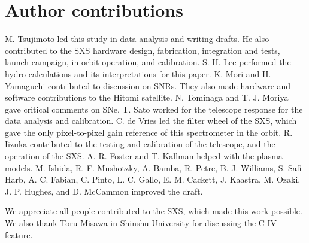 \documentclass[]{pasj01}
\newenvironment{trueauthors}{\section*{Author contributions}\fontsize{8}{11}\selectfont}{\par}
\begin{document}
\begin{trueauthors}
 M. Tsujimoto led this study in data analysis and writing drafts. He also contributed to
 the SXS hardware design, fabrication, integration and tests, launch campaign, in-orbit
 operation, and calibration. S.-H. Lee performed the hydro calculations and its
 interpretations for this paper. K. Mori and H. Yamaguchi contributed to discussion on
 SNRs. They also made hardware and software contributions to the Hitomi
 satellite. N. Tominaga and T. J. Moriya gave critical comments on SNe. T. Sato worked
 for the telescope response for the data analysis and calibration. C. de Vries led the
 filter wheel of the SXS, which gave the only pixel-to-pixel gain reference of this
 spectrometer in the orbit. R. Iizuka contributed to the testing and calibration of the
 telescope, and the operation of the SXS. A. R. Foster and T. Kallman helped with the
 plasma models. M. Ishida, R. F. Mushotzky, A. Bamba, R. Petre, B. J. Williams,
 S. Safi-Harb, A. C. Fabian, C. Pinto, L. C. Gallo, E. M. Cackett, J. Kaastra, M. Ozaki,
 J. P. Hughes, and D. McCammon improved the draft.
\end{trueauthors}

\begin{ack}
 We appreciate all people contributed to the SXS, which made this work possible. We also
 thank Toru Misawa in Shinshu University for discussing the C IV feature.

 
\end{ack}



\end{document}
